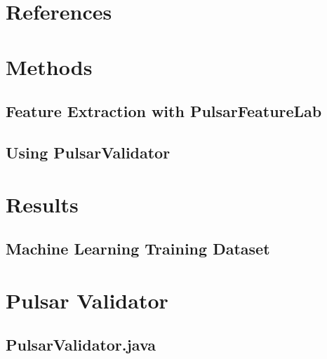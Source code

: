\documentclass{article}
\begin{document}
\pagebreak
\section{References}
\printbibliography[heading=none]

\pagebreak
\begin{appendices}

    \section{Methods}
    \begin{subappendices}
        \subsection{Feature Extraction with PulsarFeatureLab}

        \subsection{Using PulsarValidator}

    \end{subappendices}

    \section{Results}
    \subsection{Machine Learning Training Dataset}
    \label{sec:training}
    

    \pagebreak
    \section{Pulsar Validator}
    \begin{subappendices}
        \label{sec:pulsarvalidator} 
        \subsection{PulsarValidator.java}
        


\end{subappendices}
\end{appendices}
\end{document}
